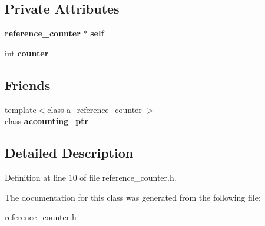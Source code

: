 \subsection*{Private Attributes}
\begin{DoxyCompactItemize}
\item 
{\bf reference\-\_\-counter} $\ast$ {\bfseries self}\label{classreference__counter_a8c6efecf70268743b6b1885fbe6c5db3}

\item 
int {\bfseries counter}\label{classreference__counter_a2fb8666dfcf5479be25461cbdfcbee7e}

\end{DoxyCompactItemize}
\subsection*{Friends}
\begin{DoxyCompactItemize}
\item 
{\footnotesize template$<$class a\-\_\-reference\-\_\-counter $>$ }\\class {\bfseries accounting\-\_\-ptr}\label{classreference__counter_a5548f94da6403f2c9c5144a964cf89f0}

\end{DoxyCompactItemize}


\subsection{Detailed Description}


Definition at line 10 of file reference\-\_\-counter.\-h.



The documentation for this class was generated from the following file\-:\begin{DoxyCompactItemize}
\item 
reference\-\_\-counter.\-h\end{DoxyCompactItemize}
